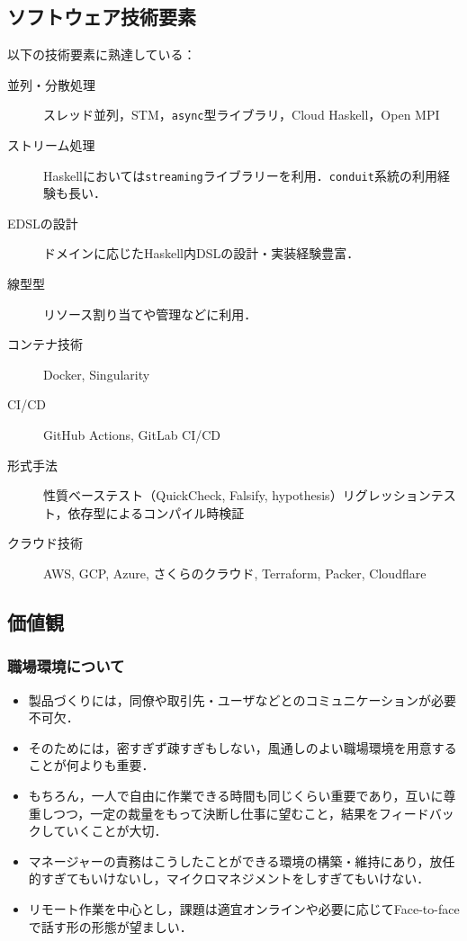 \documentclass[a4j,draft]{ltjsarticle}
\begin{document}
\subsection*{ソフトウェア技術要素}
以下の技術要素に熟達している：

\begin{description}
  \item[並列・分散処理] スレッド並列，STM，\texttt{async}型ライブラリ，Cloud Haskell，Open MPI
  \item[ストリーム処理] Haskellにおいては\texttt{streaming}ライブラリーを利用．\texttt{conduit}系統の利用経験も長い．
  \item[EDSLの設計] ドメインに応じたHaskell内DSLの設計・実装経験豊富．
  \item[線型型] リソース割り当てや管理などに利用．
  \item[コンテナ技術] Docker, Singularity
  \item[CI/CD] GitHub Actions, GitLab CI/CD
  \item[形式手法] 性質ベーステスト（QuickCheck, Falsify, hypothesis）リグレッションテスト，依存型によるコンパイル時検証
  \item[クラウド技術] AWS, GCP, Azure, さくらのクラウド, Terraform, Packer, Cloudflare
\end{description}

\subsection*{価値観}

\subsubsection*{職場環境について}
\begin{itemize}
  \item 製品づくりには，同僚や取引先・ユーザなどとのコミュニケーションが必要不可欠．
  \item そのためには，密すぎず疎すぎもしない，風通しのよい職場環境を用意することが何よりも重要．
  \item もちろん，一人で自由に作業できる時間も同じくらい重要であり，互いに尊重しつつ，一定の裁量をもって決断し仕事に望むこと，結果をフィードバックしていくことが大切．
  \item マネージャーの責務はこうしたことができる環境の構築・維持にあり，放任的すぎてもいけないし，マイクロマネジメントをしすぎてもいけない．
  \item リモート作業を中心とし，課題は適宜オンラインや必要に応じてFace-to-faceで話す形の形態が望ましい．
\end{itemize}
\end{document}
